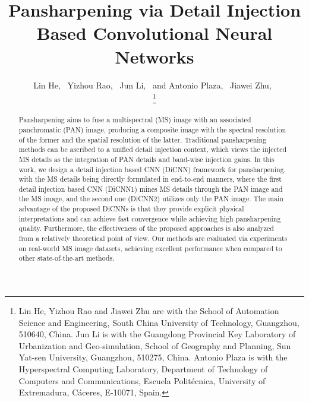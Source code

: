 \documentclass[journal]{IEEEtran}
\begin{document}
\title{Pansharpening via Detail Injection Based Convolutional Neural Networks}


\author{
        Lin He,~
        Yizhou Rao,~\IEEEmembership{}
        Jun Li,~
        and Antonio Plaza,~
        Jiawei Zhu,~\IEEEmembership{}

\thanks{Lin He, Yizhou Rao and Jiawei Zhu are with the School of Automation Science and Engineering, South China University of Technology, Guangzhou, 510640, China.
Jun Li is with the Guangdong Provincial Key Laboratory of Urbanization and Geo-simulation, School of Geography and Planning, Sun Yat-sen University, Guangzhou, 510275, China.
Antonio Plaza is with the Hyperspectral Computing Laboratory, Department of Technology of Computers and Communications, Escuela Polit\'{e}cnica, University of Extremadura, C\'{a}ceres, E-10071, Spain.
}

}




\maketitle

\begin{abstract}
Pansharpening aims to fuse a multispectral (MS) image with an associated panchromatic (PAN) image, producing a composite image with the spectral resolution of the former and the spatial resolution of the latter. Traditional pansharpening methods can be ascribed to a unified detail injection context, which views the injected MS details as the integration of PAN details and band-wise injection gains. In this work, we design a detail injection based CNN (DiCNN) framework for pansharpening, with the MS details being directly formulated in end-to-end manners, where the first detail injection based CNN (DiCNN1) mines MS details through the PAN image and the MS image, and the second one (DiCNN2) utilizes only the PAN image. The main advantage of the proposed DiCNNs is that they provide explicit physical interpretations and can achieve fast convergence while achieving high pansharpening quality. Furthermore, the effectiveness of the proposed approaches is also analyzed from a relatively theoretical point of view. Our methods are evaluated via experiments on real-world MS image datasets, achieving excellent performance when compared to other state-of-the-art methods.
\end{abstract}
\end{document}
